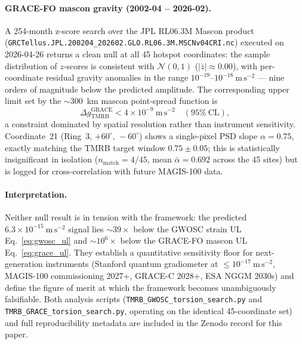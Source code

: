 \documentclass[11pt,a4paper]{article}
\begin{document}
\paragraph{GRACE-FO mascon gravity (2002-04 -- 2026-02).}
\sloppy
A 254-month z-score search over the JPL RL06.3M Mascon product
(\texttt{GRCTellus.JPL.200204\_202602.GLO.RL06.3M.MSCNv04CRI.nc}) executed on
2026-04-26 returns a clean null at all 45 hotspot coordinates: the sample
distribution of $z$-scores is consistent with $\mathcal{N}(0,1)$ ($|\bar z|
\approx 0.00$), with per-coordinate residual gravity anomalies in the range
$10^{-19}$--$10^{-18}~\mathrm{m\,s^{-2}}$ --- nine orders of magnitude below
the predicted amplitude. The corresponding upper limit set by the
$\sim$300~km mascon point-spread function is
\begin{equation}
  \Delta g_{\mathrm{TMRB}}^{\mathrm{GRACE}} < 4\times10^{-9}~\mathrm{m\,s^{-2}}
  \quad (95\%~\mathrm{CL}),
  \label{eq:grace_ul}
\end{equation}
a constraint dominated by spatial resolution rather than instrument
sensitivity.  Coordinate~21 (Ring~3, $+60^\circ,\,-60^\circ$) shows a
single-pixel PSD slope $\alpha=0.75$, exactly matching the TMRB target window
$0.75\pm0.05$; this is statistically insignificant in isolation
($n_{\mathrm{match}}=4/45$, mean $\bar\alpha = 0.692$ across the 45 sites)
but is logged for cross-correlation with future MAGIS-100 data.

\paragraph{Interpretation.}
Neither null result is in tension with the framework: the predicted
$6.3\times10^{-15}~\mathrm{m\,s^{-2}}$ signal lies $\sim 39\times$ below the
GWOSC strain UL Eq.~\eqref{eq:gwosc_ul} and $\sim 10^{6}\times$ below the
GRACE-FO mascon UL Eq.~\eqref{eq:grace_ul}. They establish a quantitative
sensitivity floor for next-generation instruments (Stanford quantum
gradiometer at $\leq 10^{-17}~\mathrm{m\,s^{-2}}$, MAGIS-100 commissioning
2027+, GRACE-C 2028+, ESA NGGM 2030s) and define the figure of merit at which
the framework becomes unambiguously falsifiable. Both analysis scripts
(\texttt{TMRB\_GWOSC\_torsion\_search.py} and
\texttt{TMRB\_GRACE\_torsion\_search.py}, operating on the identical
45-coordinate set) and full reproducibility metadata are included
in the Zenodo record for this paper.
\end{document}
